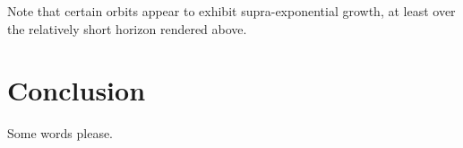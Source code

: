 \documentclass[12pt,reqno]{article}
\begin{document}
Note that certain orbits appear to exhibit supra-exponential growth, at least over the relatively short horizon rendered above. 

\section{Conclusion}

Some words please.
\end{document}
